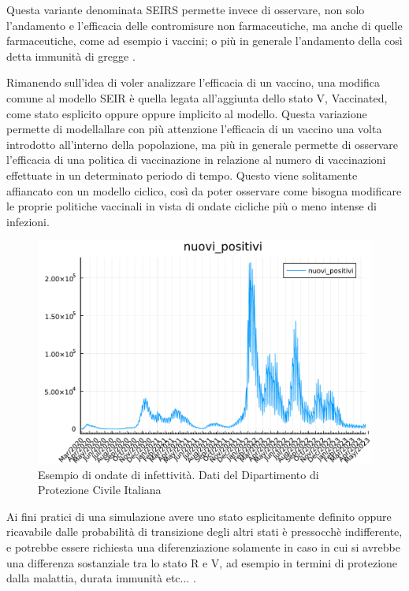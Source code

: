 Questa variante denominata SEIRS permette invece di osservare, non solo l'andamento e 
l'efficacia delle contromisure non farmaceutiche, ma anche di quelle
farmaceutiche, come ad esempio i vaccini; o più in generale l'andamento
della così detta immunità di gregge \cite{Bjornstad2020}. 

Rimanendo sull'idea di voler analizzare l'efficacia di un vaccino, una
modifica comune al modello SEIR è quella legata all'aggiunta dello stato V,
Vaccinated, come stato esplicito oppure oppure implicito al modello. Questa 
variazione permette di modellallare con più attenzione l'efficacia di un 
vaccino una volta introdotto all'interno della popolazione, 
ma più in generale permette di osservare l'efficacia di una politica di vaccinazione 
in relazione al numero di vaccinazioni effettuate in un determinato periodo di tempo.
Questo viene solitamente affiancato con un modello ciclico, così da poter
osservare come bisogna modificare le proprie politiche vaccinali in vista
di ondate cicliche più o meno intense di infezioni.

\begin{figure}[h]
    \begin{center}
        \includegraphics[scale=0.6]{img/nuovi_positivi_2023-04-21.pdf}
        \caption{Esempio di ondate di infettività. Dati del Dipartimento di Protezione Civile Italiana}
        \label{fig:DPC_new_positive}
    \end{center}
\end{figure}

Ai fini pratici di una simulazione avere uno stato esplicitamente definito
oppure ricavabile dalle probabilità di transizione degli altri stati 
è pressocchè indifferente, e potrebbe essere richiesta una diferenziazione
solamente in caso in cui si avrebbe una differenza sostanziale tra lo stato
R e V, ad esempio in termini di protezione dalla malattia, durata immunità etc... .


